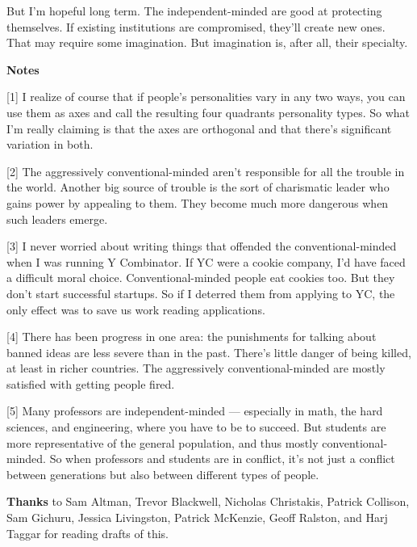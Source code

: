 But I'm hopeful long term. The independent-minded are good at protecting
themselves. If existing institutions are compromised, they'll create new
ones. That may require some imagination. But imagination is, after all,
their specialty.

\textbf{Notes}

{[}1{]} I realize of course that if people's personalities vary in any
two ways, you can use them as axes and call the resulting four quadrants
personality types. So what I'm really claiming is that the axes are
orthogonal and that there's significant variation in both.

{[}2{]} The aggressively conventional-minded aren't responsible for all
the trouble in the world. Another big source of trouble is the sort of
charismatic leader who gains power by appealing to them. They become
much more dangerous when such leaders emerge.

{[}3{]} I never worried about writing things that offended the
conventional-minded when I was running Y Combinator. If YC were a cookie
company, I'd have faced a difficult moral choice. Conventional-minded
people eat cookies too. But they don't start successful startups. So if
I deterred them from applying to YC, the only effect was to save us work
reading applications.

{[}4{]} There has been progress in one area: the punishments for talking
about banned ideas are less severe than in the past. There's little
danger of being killed, at least in richer countries. The aggressively
conventional-minded are mostly satisfied with getting people fired.

{[}5{]} Many professors are independent-minded --- especially in math,
the hard sciences, and engineering, where you have to be to succeed. But
students are more representative of the general population, and thus
mostly conventional-minded. So when professors and students are in
conflict, it's not just a conflict between generations but also between
different types of people.

\textbf{Thanks} to Sam Altman, Trevor Blackwell, Nicholas Christakis,
Patrick Collison, Sam Gichuru, Jessica Livingston, Patrick McKenzie,
Geoff Ralston, and Harj Taggar for reading drafts of this.
